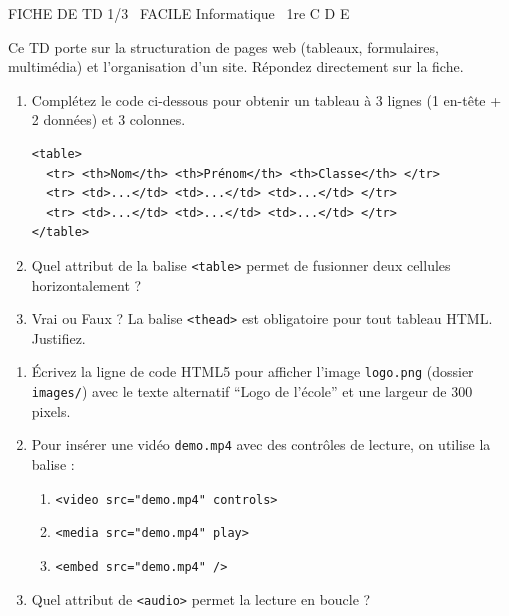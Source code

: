 \documentclass[11pt]{article}
\begin{document}
\begin{tcolorbox}[enhanced,colback=popink,colframe=popink,arc=10pt,boxrule=0pt,left=12pt,right=12pt,top=9pt,bottom=9pt]
{\color{white}\popxbold\small FICHE DE TD 1/3 \textbullet\ FACILE \hfill Informatique \textbullet\ 1re C D E\par}
\end{tcolorbox}
\vspace{4pt}
Ce TD porte sur la structuration de pages web (tableaux, formulaires, multimédia) et l'organisation d'un site. Répondez directement sur la fiche.

\begin{exercice}
\begin{enumerate}
    \item Complétez le code ci-dessous pour obtenir un tableau à 3 lignes (1 en-tête + 2 données) et 3 colonnes.
\begin{verbatim}
<table>
  <tr> <th>Nom</th> <th>Prénom</th> <th>Classe</th> </tr>
  <tr> <td>...</td> <td>...</td> <td>...</td> </tr>
  <tr> <td>...</td> <td>...</td> <td>...</td> </tr>
</table>
\end{verbatim}
    \item Quel attribut de la balise \texttt{<table>} permet de fusionner deux cellules horizontalement ?
    \item Vrai ou Faux ? La balise \texttt{<thead>} est obligatoire pour tout tableau HTML. Justifiez.
\end{enumerate}
\end{exercice}

\begin{exercice}
\begin{enumerate}
    \item Écrivez la ligne de code HTML5 pour afficher l'image \texttt{logo.png} (dossier \texttt{images/}) avec le texte alternatif ``Logo de l'école'' et une largeur de 300 pixels.
    \item Pour insérer une vidéo \texttt{demo.mp4} avec des contrôles de lecture, on utilise la balise : 
    \begin{enumerate}
        \item \texttt{<video src="demo.mp4" controls>}
        \item \texttt{<media src="demo.mp4" play>}
        \item \texttt{<embed src="demo.mp4" />}
    \end{enumerate}
    \item Quel attribut de \texttt{<audio>} permet la lecture en boucle ?
\end{enumerate}
\end{exercice}
\end{document}
